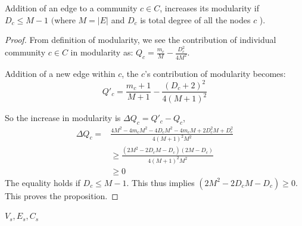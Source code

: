 \begin{prop}\label{1}
Addition of an edge to a community $c\in C$, increases its modularity if $D_c\leq M-1$ $($where $M=|E|$ and $D_c$ is total degree of all the nodes $c$ ).
\end{prop}


\begin{proof}
From definition of modularity, we see the contribution of individual community $c\in C$ in modularity as: $Q_c=\frac{m_c}{M} - \frac{D_c^2}{4M^2}$. 

Addition of a new edge within $c$, the $c$'s contribution of modularity becomes:
\[
Q'_c=\frac{m_c+1}{M+1} - \frac{(D_c+2)^2}{4(M+1)^2}
\]

So the increase in modularity is $\Delta Q_c=Q'_c-Q_c$,
\[
\begin{split}
\Delta Q_c=&\frac{4M^2-4m_cM^2-4D_cM^2-4m_cM+2D_c^2M+D_c^2}{4(M+1)^2M^2}\\
&\geq\frac{(2M^2-2D_cM-D_c)(2M-D_c)}{4(M+1)^2M^2}\\
&\geq 0
\end{split}
\]
The equality holds if $D_c\leq M-1$. This thus implies $(2M^2-2D_cM-D_c)\geq 0$. This proves the proposition.
\end{proof}

\begin{function1}[!ht]
\caption{\small$BothinSample(u,v,e_t,V_s,E_s,C_s)$} 
\label{bothsample} 
\Return $V_s,E_s,C_s$   
\end{function1}

